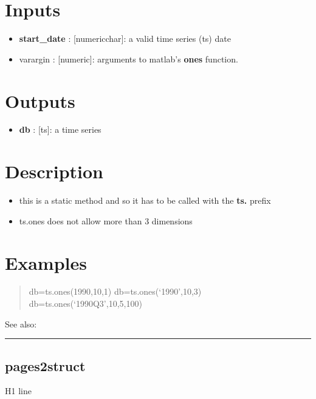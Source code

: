 \documentclass[letterpaper,10pt,english]{sphinxmanual}
\begin{document}
\section{Inputs}
\label{classes/time_series/@ts/ts:id410}\begin{itemize}
\item {} 
\textbf{start\_date} : {[}numeric\textbar{}char{]}: a valid time series (ts) date

\item {} 
varargin : {[}numeric{]}: arguments to matlab's \textbf{ones} function.

\end{itemize}


\section{Outputs}
\label{classes/time_series/@ts/ts:id411}\begin{itemize}
\item {} 
\textbf{db} : {[}ts{]}: a time series

\end{itemize}


\section{Description}
\label{classes/time_series/@ts/ts:id412}\begin{itemize}
\item {} 
this is a static method and so it has to be called with the \textbf{ts.}
prefix

\item {} 
ts.ones does not allow more than 3 dimensions

\end{itemize}


\section{Examples}
\label{classes/time_series/@ts/ts:id413}\begin{quote}

db=ts.ones(1990,10,1)
db=ts.ones(`1990',10,3)
db=ts.ones(`1990Q3',10,5,100)
\end{quote}

See also:


\bigskip\hrule{}\bigskip



\subsection{pages2struct}
\label{classes/time_series/@ts/ts:pages2struct}\label{classes/time_series/@ts/ts:id414}
H1 line
\end{document}
